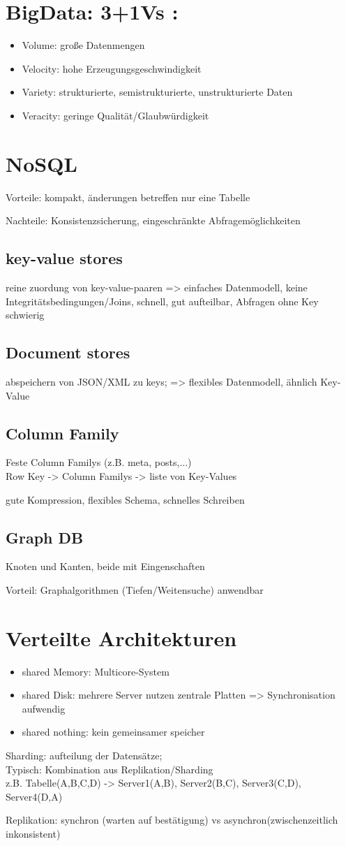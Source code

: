 
\section*{BigData: 3+1Vs : }
\begin{itemize}
\item Volume: große Datenmengen
\item Velocity: hohe Erzeugungsgeschwindigkeit
\item Variety: strukturierte, semistrukturierte, unstrukturierte Daten
\item Veracity: geringe Qualität/Glaubwürdigkeit
\end{itemize}

\section*{NoSQL}
Vorteile: kompakt, änderungen betreffen nur eine Tabelle

Nachteile: Konsistenzsicherung, eingeschränkte Abfragemöglichkeiten
\subsection*{key-value stores}
reine zuordung von key-value-paaren => einfaches Datenmodell, keine Integritätsbedingungen/Joins, schnell, gut aufteilbar, Abfragen ohne Key schwierig

\subsection*{Document stores}
abspeichern von JSON/XML zu keys; => flexibles Datenmodell, ähnlich Key-Value


\subsection*{Column Family}
Feste Column Familys (z.B. meta, posts,$\dots$) \\
Row Key -> Column Familys -> liste von Key-Values

gute Kompression, flexibles Schema, schnelles Schreiben

\subsection*{Graph DB}
Knoten und Kanten, beide mit Eingenschaften

Vorteil: Graphalgorithmen (Tiefen/Weitensuche) anwendbar

\section*{Verteilte Architekturen}
\begin{itemize}
\item shared Memory: Multicore-System
\item shared Disk: mehrere Server nutzen zentrale Platten => Synchronisation aufwendig
\item shared nothing: kein gemeinsamer speicher
\end{itemize}

Sharding: aufteilung der Datensätze; \\
Typisch: Kombination aus Replikation/Sharding\\
z.B. Tabelle(A,B,C,D) -> Server1(A,B), Server2(B,C), Server3(C,D), Server4(D,A)

Replikation: synchron (warten auf bestätigung) vs asynchron(zwischenzeitlich inkonsistent)
